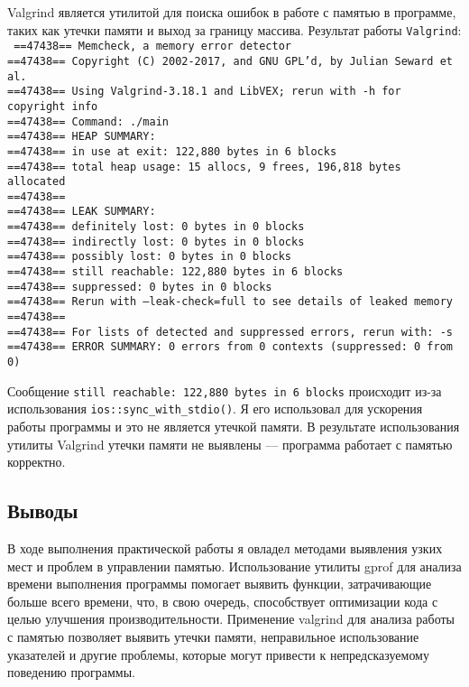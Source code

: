 \documentclass[12pt]{article}
\begin{document}
Valgrind является утилитой для поиска ошибок в работе с памятью в программе, таких
как утечки памяти и выход за границу массива.
Результат работы \texttt{Valgrind}: \\
\texttt{
    ==47438== Memcheck, a memory error detector\\
==47438== Copyright (C) 2002-2017, and GNU GPL'd, by Julian Seward et al.\\   
==47438== Using Valgrind-3.18.1 and LibVEX; rerun with -h for copyright info\\
==47438== Command: ./main\\
==47438== HEAP SUMMARY:\\
==47438==     in use at exit: 122,880 bytes in 6 blocks\\
==47438==   total heap usage: 15 allocs, 9 frees, 196,818 bytes allocated\\
==47438==\\
==47438== LEAK SUMMARY:\\
==47438==    definitely lost: 0 bytes in 0 blocks\\
==47438==    indirectly lost: 0 bytes in 0 blocks\\
==47438==      possibly lost: 0 bytes in 0 blocks\\
==47438==    still reachable: 122,880 bytes in 6 blocks\\
==47438==         suppressed: 0 bytes in 0 blocks\\
==47438== Rerun with --leak-check=full to see details of leaked memory\\
==47438==\\
==47438== For lists of detected and suppressed errors, rerun with: -s\\
==47438== ERROR SUMMARY: 0 errors from 0 contexts (suppressed: 0 from 0)\\
}

Сообщение \texttt{still reachable: 122,880 bytes in 6 blocks} происходит из-за использования \texttt{ios::sync\_with\_stdio()}.
Я его использовал для ускорения работы программы и это не является утечкой памяти. В результате использования утилиты Valgrind утечки памяти не выявлены — программа работает с памятью корректно.

\newpage
\subsection*{Выводы}
В ходе выполнения практической работы я овладел методами выявления узких мест и проблем в управлении памятью. 
Использование утилиты gprof для анализа времени выполнения программы помогает выявить функции, затрачивающие больше всего времени, что, в свою очередь, способствует оптимизации кода с целью улучшения производительности. 
Применение valgrind для анализа работы с памятью позволяет выявить утечки памяти, неправильное использование указателей и другие проблемы, которые могут привести к непредсказуемому поведению программы.
\end{document}
